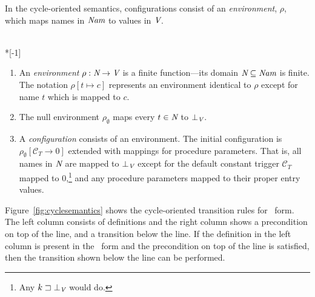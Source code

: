 \documentclass[12pt,titlepage,twoside]{article}
\newcommand{\sgt}{\sqsupset}%
\begin{document}
In the cycle-oriented semantics, configurations consist of an
\emph{environment}, $\rho$, which maps
names in ${\mbox{\em Nam}}$ to values in ${\mbox{\em V}}$.

\begin{definition}~\\*[-1\baselineskip]
\begin{enumerate}
\item An \emph{environment} $\rho: {\mbox{\em N}} \to {\mbox{\em V}}$ is a
finite function---its domain ${\mbox{\em N}} \subseteq {\mbox{\em Nam}}$ is
finite.  The notation $\rho[t\mapsto c]$ represents an environment
identical to $\rho$ except for name $t$ which is mapped to $c$.
\item The null environment $\rho_\emptyset$ maps every $t\in{\mbox{\em N}}$ to
$\bot_{\mbox{\scriptsize\em V}}$.
\item A \emph{configuration} consists of an environment.  The initial
configuration is $\rho_\emptyset[\mathcal{C}_T\to 0]$ extended with
mappings for procedure parameters.  That is, all names in ${\mbox{\em N}}$
are mapped to $\bot_{\mbox{\scriptsize\em V}}$ except for the default constant trigger
$\mathcal{C}_T$ mapped to 0,\footnote{Any $k\sgt\bot_\domainsm{V}$
would do.} and any procedure parameters mapped to their proper entry values.
\end{enumerate}
\end{definition}

Figure~\vref{fig:cyclesemantics} shows the cycle-oriented transition
rules for \ssiplus\ form.  The left column consists of definitions and
the right column shows a precondition on top of the line, and a
transition below the line.  If the definition in the left column is
present in the \ssiplus\ form and the precondition on top of the line
is satisfied, then the transition shown below the line can be performed.
\end{document}
